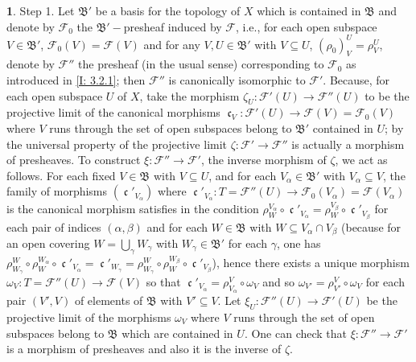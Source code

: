\documentclass[12pt]{amsart}
\newcommand{\can}{\operatorname{\mathfrak{c}}}
\theoremstyle{definition}
\newtheorem{bk}[proposition]{}
\begin{document}
\begin{bk}
Step 1. Let $\mathfrak{B}'$ be a basis for the topology of $X$ which is contained in $\mathfrak{B}$ and denote by $\mathscr{F}_{0}$ the $\mathfrak{B}'-$presheaf induced by $\mathscr{F}$, i.e., for each open subspace $V\in\mathfrak{B}'$,  $\mathscr{F}_{0}(V)=\mathscr{F}(V)$ and for any $V, U\in\mathfrak{B}'$ with $V\subseteq U$, $(\rho_{0})_{V}^{U}=\rho_{V}^{U}$, denote by $\mathscr{F}''$  the presheaf (in the usual sense) corresponding to $\mathscr{F}_{0}$ as introduced in \ref{I: 3.2.1}; then $\mathscr{F}''$ is canonically isomorphic to $\mathscr{F}'$. Because, for each open subspace $U$ of $X$, take the morphism $\zeta_{U}:\mathscr{F}'(U)\rightarrow\mathscr{F}''(U)$ to be the projective limit of the canonical morphisms $\can_{V}: \mathscr{F}'(U)\rightarrow\mathscr{F}(V)=\mathscr{F}_{0}(V)$ where $V$ runs through the set of open subspaces belong to $\mathfrak{B}'$ contained in $U$; by the universal property of the projective limit $\zeta:\mathscr{F}'\rightarrow\mathscr{F}''$ is actually a morphism of presheaves. To construct $\xi:\mathscr{F}''\rightarrow\mathscr{F}'$, the inverse morphism of $\zeta$, we act as follows. For each fixed $V\in\mathfrak{B}$ with $V\subseteq U$, and for each $V_{\alpha}\in\mathfrak{B}'$ with $V_{\alpha}\subseteq V$, the family of morphisms $(\can'_{V_{\alpha}})$ where $\can'_{V_{\alpha}}: T=\mathscr{F}''(U)\rightarrow\mathscr{F}_{0}(V_{\alpha})
=\mathscr{F}(V_{\alpha})$ is the canonical morphism satisfies in the condition $\rho_{W}^{V_{\alpha}}\circ\can'_{V_{\alpha}}
=\rho_{W}^{V_{\beta}}\circ\can'_{V_{\beta}}$ for each pair of indices $(\alpha, \beta)$ and for each $W\in\mathfrak{B}$ with $W\subseteq V_{\alpha}\cap V_{\beta}$ (because for an open covering  $W=\bigcup\limits_{\gamma}W_{\gamma}$ with $W_{\gamma}\in\mathfrak{B}'$ for each $\gamma$, one has $\rho_{W_{\gamma}}^{W}\circ\rho_{W}^{W_{\alpha}}\circ
\can'_{V_{\alpha}}=\can'_{W_{\gamma}}=\rho_{W_{\gamma}}^{W}
\circ\rho_{W}^{W_{\beta}}\circ\can'_{V_{\beta}}$),
hence there exists a unique morphism $\omega_{V}: T=\mathscr{F}''(U)\rightarrow\mathscr{F}(V)$ so that $\can'_{V_{\alpha}}=\rho_{V_{\alpha}}^{V}\circ\omega_{V}$ and so $\omega_{V'}=\rho_{V'}^{V}\circ\omega_{V}$ for each pair $(V', V)$ of elements of $\mathfrak{B}$ with $V'\subseteq V$. Let $\xi_{U}:\mathscr{F}''(U)\rightarrow\mathscr{F}'(U)$ be the projective limit of the morphisms $\omega_{V}$ where $V$ runs through the set of open subspaces belong to $\mathfrak{B}$ which are contained in $U$. One can check that $\xi:\mathscr{F}''\rightarrow\mathscr{F}'$ is a morphism of presheaves and also it is the inverse of $\zeta$.\\

\end{bk}
\end{document}
